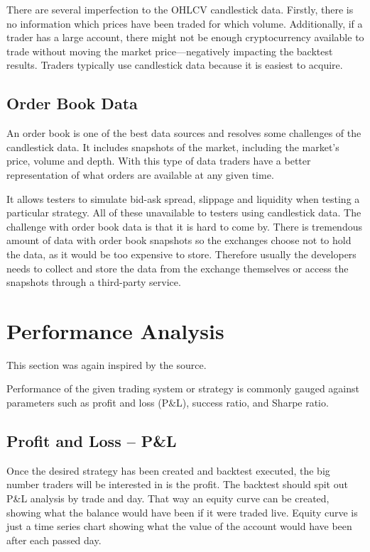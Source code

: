 There are several imperfection to the OHLCV candlestick data. Firstly, there is no information which prices have been traded for which volume. Additionally, if a trader has a large account, there might not be enough cryptocurrency available to trade without moving the market price---negatively impacting the backtest results. Traders typically use candlestick data because it is easiest to acquire.

\subsection*{Order Book Data}
An order book is one of the best data sources and resolves some challenges of the candlestick data. It includes snapshots of the market, including the market's price, volume and depth. With this type of data traders have a better representation of what orders are available at any given time.

It allows testers to simulate bid-ask spread, slippage and liquidity when testing a particular strategy. All of these unavailable to testers using candlestick data. The challenge with order book data is that it is hard to come by. There is tremendous amount of data with order book snapshots so the exchanges choose not to hold the data, as it would be too expensive to store. Therefore usually the developers needs to collect and store the data from the exchange themselves or access the snapshots through a third-party service.

\section{Performance Analysis}
\label{performance-analysis}
This section was again inspired by the \cite{backtesting-crypto-trading-strategies} source.

Performance of the given trading system or strategy is commonly gauged against parameters such as profit and loss (P\&L), success ratio, and Sharpe ratio.

\subsection*{Profit and Loss -- P\&L}
Once the desired strategy has been created and backtest executed, the big number traders will be interested in is the profit. The backtest should spit out P\&L analysis by trade and day. That way an equity curve can be created, showing what the balance would have been if it were traded live. Equity curve is just a time series chart showing what the value of the account would have been after each passed day.

